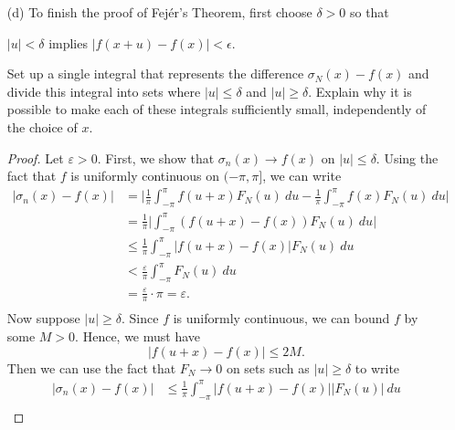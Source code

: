\begin{enumerate}
\begin{proof}
\begin{align*}
                                                    &=  \pi.
        \end{align*}
        Hence, we have 
        \[  \int_{ -\pi  }^{ \pi  } F_{N}(u)  \ du = \pi. \]
        \end{proof}
    \item[(d)] To finish the proof of Fej\'{e}r's  Theorem, first choose \( \delta > 0  \) so that 
        \begin{center}
            \( | u  |  < \delta  \) implies \( |  f(x+u) - f(x)  | < \epsilon. \)
        \end{center}
        Set up a single integral that represents the difference \( \sigma_{N}(x) - f(x)  \) and divide this integral into sets where \( | u  |  \leq \delta  \) and \( |  u  |  \geq \delta  \). Explain why it is possible to make each of these integrals sufficiently small, independently of the choice of \( x  \).
        \begin{proof}
        Let \( \varepsilon > 0  \). First, we show that \( \sigma_{n}(x) \to f(x)  \) on \( | u  |  \leq \delta \). Using the fact that \( f  \) is uniformly continuous on \( (-\pi,\pi] \), we can write
        \begin{align*}
            | \sigma_{n}(x) - f(x) | &= \Big| \frac{ 1 }{ \pi  } \int_{ -\pi  }^{ \pi  } f(u+x) F_{N}(u)  \ du - \frac{ 1 }{ \pi  } \int_{ -\pi  }^{ \pi  } f(x) F_{N}(u)  \ du  \Big|  \\
                                     &= \frac{ 1 }{ \pi  } \Big| \int_{ -\pi  }^{ \pi  } (f(u+x) - f(x)) F_{N}(u)  \ du \Big| \\
                                     &\leq \frac{ 1 }{ \pi  } \int_{ -\pi }^{ \pi  } | f(u+x) - f(x)  | F_{N}(u)  \ du \\
                                     &< \frac{ \varepsilon }{ \pi  } \int_{ -\pi }^{ \pi  } F_{N}(u)  \ du \\ 
                                     &=  \frac{ \varepsilon }{ \pi }  \cdot \pi = \varepsilon. \\
        \end{align*}
        Now suppose \( | u  | \geq \delta \). Since \( f \) is uniformly continuous, we can bound \( f  \) by some \( M > 0  \). Hence, we must have 
        \[  | f(u+x) - f(x) | \leq 2M. \] 
        Then we can use the fact that \( F_{N} \to 0  \) on sets such as \( | u  |  \geq \delta \) to write 
        \begin{align*}
           | \sigma_{n}(x) - f(x) |  &\leq \frac{ 1 }{ \pi  } \int_{ -\pi  }^{ \pi  } | f(u+x) - f(x) | |F_{N}(u) | \ du \\

\end{align*}
\end{proof}
\end{enumerate}
